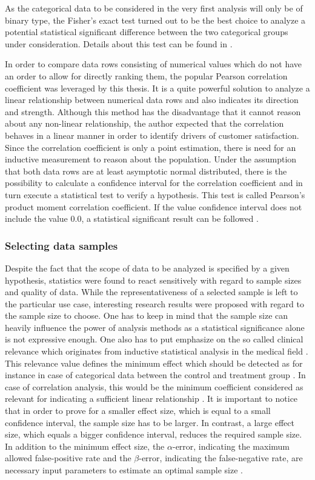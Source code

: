 As the categorical data to be considered in the very first analysis will only be of binary type, the Fisher's exact test turned out to be the best choice to analyze a potential statistical significant difference between the two categorical groups under consideration. Details about this test can be found in \cite{fishers1992}. 

In order to compare data rows consisting of numerical values which do not have an order to allow for directly ranking  them, the popular Pearson correlation coefficient was leveraged by this thesis. It is a quite powerful solution to analyze a linear relationship between numerical data rows and also indicates its direction and strength. Although this method has the disadvantage that it cannot reason about any non-linear relationship, the author expected that the correlation behaves in a linear manner in order to identify drivers of customer satisfaction. Since the correlation coefficient is only a point estimation, there is need for an inductive measurement to reason about the population. Under the assumption that both data rows are at least asymptotic normal distributed, there is the possibility to calculate a confidence interval for the correlation coefficient and in turn execute a statistical test to verify a hypothesis. This test is called Pearson's product moment correlation coefficient. If the value confidence interval does not include the value $0.0$, a statistical significant result can be followed \cite{lee1988thirteen} \cite{artusi2002bravais}. 

\subsubsection{Selecting data samples}
Despite the fact that the scope of data to be analyzed is specified by a given hypothesis, statistics were found to react sensitively with regard to sample sizes and quality of data. While the representativeness of a selected sample is left to the particular use case, interesting research results were proposed with regard to the sample size to choose. One has to keep in mind that the sample size can heavily influence the power of analysis methods as a statistical significance alone is not expressive enough. One also has to put emphasize on the so called clinical relevance which originates from inductive statistical analysis in the medical field \cite{campbell1995estimating}. This relevance value defines the minimum effect which should be detected as for instance in case of categorical data between the control and treatment group \cite{kadam2010sample}. In case of correlation analysis, this would be the minimum coefficient considered as relevant for indicating a sufficient linear relationship \cite{moinester2014sample}. It is important to notice that in order to prove for a smaller effect size, which is equal to a small confidence interval, the sample size has to be larger. In contrast, a large effect size, which equals a bigger confidence interval, reduces the required sample size. In addition to the minimum effect size, the $\alpha$-error, indicating the maximum allowed false-positive rate and the $\beta$-error, indicating the false-negative rate, are necessary input parameters to estimate an optimal sample size \cite{kadam2010sample}.

